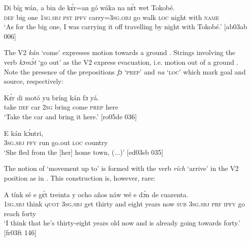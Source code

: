 \ea%
    \label{ex:key:1545}
    \gll Di  bíg  wán,  a    bin  de  kɛ́r=an    gó  wáka
na  nɛ́t    wet    Tokobé. \\
\textsc{def}  big  one    \textsc{1sg.sbj}  \textsc{pst}  \textsc{ipfv}  carry=\textsc{3sg.obj}  go  walk
\textsc{loc}  night  with    \textsc{name}\\

\glt ‘As for the big one, I was carrying it off travelling by night with Tokobé.’ [ab03ab 006]
\z

The V2 \textit{kán} ‘come’ expresses motion towards a ground . Strings involving the verb \textit{kɔmɔ́t} ‘go out’ as the V2 express evacuation, i.e. motion out of a ground . Note the presence of the prepositions \textit{fɔ} ‘\textsc{prep’} and \textit{na} ‘\textsc{loc’} which mark goal and source,\index{} respectively:


\ea%
    \label{ex:key:1546}
    \gll Kɛ́r    di  motó  yu  bríng  kán    fɔ  yá.\\
take    \textsc{def}  car    \textsc{2sg}  bring  come  \textsc{prep}  here\\

\glt ‘Take the car and bring it here.’ [ro05de 036]
\z


\ea%
    \label{ex:key:1547}
    \gll E    kán       kɔ́ntri,    \\
\textsc{3sg.sbj}  \textsc{pfv}  run  go.out  \textsc{loc}  country\\

\glt ‘She fled from the [her] home town, (...)’ [ed03sb 035]
\z

The notion of ‘movement up to’ is formed with the verb \textit{rích} ‘arrive’ in the V2 position as in . This construction is, however, rare: 


\ea%
    \label{ex:key:1548}
    \gll A    tínk    sé    e    gɛ́t  treinta  y  ocho  años  náw
wé  e    dɔ́n  de        cuarenta.\\
\textsc{1sg.sbj}  think  \textsc{quot}    \textsc{3sg.sbj}  get  thirty  and  eight  years  now
\textsc{sub}  \textsc{3sg.sbj}  \textsc{prf}  \textsc{ipfv}  go  reach  forty\\

\glt ‘I think that he’s thirty-eight years old now and is already going towards forty.’ [fr03ft 146]
\z

